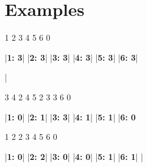 \documentclass{../codeproblem}
\begin{document}
\section*{Examples}
\begin{minipage}[t]{.33\linewidth}
\begin{example}
1 2 3
4 5 6
0

|\textbf{1: 3}|
|\textbf{2: 3}|
|\textbf{3: 3}|
|\textbf{4: 3}|
|\textbf{5: 3}|
|\textbf{6: 3}|

|\end{example}
\end{minipage}
\begin{minipage}[t]{.33\linewidth}
\begin{example}
3 4
2 4 5
2 3
3 6
0

|\textbf{1: 0}|
|\textbf{2: 1}|
|\textbf{3: 3}|
|\textbf{4: 1}|
|\textbf{5: 1}|
|\textbf{6: 0}\end{example}
\end{minipage}
\begin{minipage}[t]{.33\linewidth}
\begin{example}
1 2
2 3 4
5 6
0

|\textbf{1: 0}|
|\textbf{2: 2}|
|\textbf{3: 0}|
|\textbf{4: 0}|
|\textbf{5: 1}|
|\textbf{6: 1}|
|\end{example}
\end{minipage}
\end{document}
